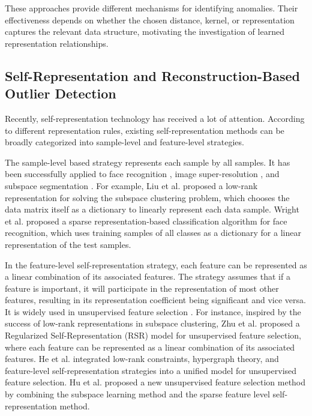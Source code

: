 \documentclass[ASNA,twocolumn]{USG} %
\begin{document}
These approaches provide different mechanisms for identifying anomalies. Their effectiveness depends on whether the chosen distance, kernel, or representation captures the relevant data structure, motivating the investigation of learned representation relationships.

\subsection{Self-Representation and Reconstruction-Based Outlier Detection}

Recently, self-representation technology has received a lot of attention. According to different representation rules, existing self-representation methods can be broadly categorized into sample-level and feature-level strategies.

The sample-level based strategy represents each sample by all samples. It has been successfully applied to face recognition \cite{4483511}, image super-resolution \cite{yang2010image}, and subspace segmentation \cite{6180173}. For example, Liu et al. \cite{6180173} proposed a low-rank representation for solving the subspace clustering problem, which chooses the data matrix itself as a dictionary to linearly represent each data sample. 
Wright et al. \cite{4483511} proposed a sparse representation-based classification algorithm for face recognition, which uses training samples of all classes as a dictionary for a linear representation of the test samples.

In the feature-level self-representation strategy, each feature can be represented as a linear combination of its associated features.
The strategy assumes that if a feature is important, it will participate in the representation of most other features, resulting in its representation coefficient being significant and vice versa. It is widely used in unsupervised feature selection \cite{zhu2015unsupervised,he2017feature,hu2017graph}. For instance, inspired by the success of low-rank representations in subspace clustering, Zhu et al. \cite{zhu2015unsupervised} proposed a Regularized Self-Representation (RSR) model for unsupervised feature selection, where each feature can be represented as a linear combination of its associated features.
He et al. \cite{he2017feature} integrated low-rank constraints, hypergraph theory, and feature-level self-representation strategies into a unified model for unsupervised feature selection. 
Hu et al. \cite{hu2017graph} proposed a new unsupervised feature selection method by combining the subspace learning method and the sparse feature level self-representation method.
\end{document}
